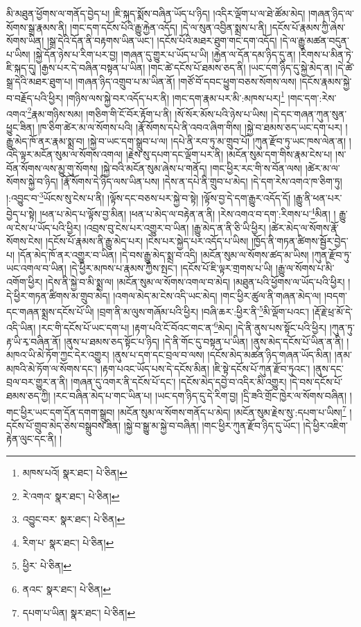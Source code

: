 མི་མཐུན་ཕྱོགས་ལ་གནོད་བྱེད་པ། །ཇི་སྐད་སྨོས་བཞིན་ཡོད་པ་ཉིད། །འདིར་ལྡོག་པ་ལ་ཐེ་ཚོམ་མེད། །གཞན་ཉིད་ལ་སོགས་སྒྲ་རྣམས་ནི། །གང་དག་དངོས་པོའི་རྒྱུ་རྐྱེན་འདོད། །དེ་ལ་སུན་འབྱིན་སྨྲས་པ་ནི། །དངོས་པོ་རྣམས་ཀྱི་ཞེས་སོགས་ཡིན། །སྒྲ་དེའི་དོན་ནི་བརྟགས་ཡིན་ཡང་། །དངོས་པོའི་མཐར་ཐུག་གང་དག་འདོད། །དེ་ལ་རྒྱུ་མཚན་བདུན་པ་ཡིས། །སྐྱེ་དོན་ཉེས་པ་རིག་པར་བྱ། །གཞན་དུ་གྱུར་པ་ཡོད་པ་ཡི། །རྐྱེན་ལ་དོན་དམ་ཉིད་དུ་ན། །རིགས་པ་མིན་ཏེ་ཇི་སྐད་དུ། །རྒྱས་པར་དེ་བཞིན་བསྟན་པ་ཡིན། །གང་ཚེ་དངོས་པོ་ཐམས་ཅད་ནི། །ཡང་དག་ཉིད་དུ་སྐྱེ་མེད་ན། །དེ་ཚེ་སྒྲ་དེའི་མཐར་ཐུག་པ། །གཞན་ཉིད་འགྲུབ་པ་མ་ཡིན་ནོ། །གཙོ་བོ་དབང་ཕྱུག་བཅས་སོགས་ལས། །དངོས་རྣམས་སྐྱེ་བ་བརྗོད་པའི་ཕྱིར། །གཉིས་ལས་སྐྱེ་བར་འདོད་པར་ནི། །གང་དག་རྣམ་པར་མི་:མཁས་པར།\footnote{མཁས་པའོ།  སྣར་ཐང་།  པེ་ཅིན། } །གང་དག་:རེས་འགའ་\footnote{རེ་འགའ་  སྣར་ཐང་།  པེ་ཅིན། }རྣམ་གཉིས་སམ། །གཅིག་གི་ངོ་བོར་རྟོག་པ་ནི། །སོ་སོར་མོས་པའི་ཉེས་པ་ཡིས། །དེ་དང་གཞན་ཀུན་སུན་ཕྱུང་ཟིན། །ཁ་ཅིག་ཚེར་མ་ལ་སོགས་པའི། །རྣོ་སོགས་དཔེ་ནི་འབའ་ཞིག་གིས། །སྐྱེ་བ་ཐམས་ཅད་ཡང་དག་པར། །རྒྱུ་མེད་ཁོ་ནར་རྣམ་སྨྲ་བ། །སྐྱེ་བ་ཡང་དག་སྒྲུབ་པ་ལ། །དཔེ་ནི་རབ་ཏུ་མ་གྲུབ་པོ། །ཀུན་རྫོབ་ཏུ་ཡང་ཁས་ལེན་ན། །འདི་ལྟར་མངོན་སུམ་ལ་སོགས་འགལ། །རྗེས་སུ་དཔག་དང་ལྡོག་པར་ནི། །མངོན་སུམ་དག་གིས་རྣམ་ངེས་པ། །ས་བོན་སོགས་ལས་མྱུ་གུ་སོགས། །སྐྱེ་བའི་མངོན་སུམ་ཞེས་པ་གནོད། །གང་ཕྱིར་རང་གི་ས་བོན་ལས། །ཚེར་མ་ལ་སོགས་སྐྱེ་བ་ཉིད། །རྣོ་སོགས་དེ་ཉིད་ལས་ཡིན་པས། །དེས་ན་དཔེ་ནི་གྲུབ་པ་མེད། །དེ་དག་རེས་འགའ་ཁ་ཅིག་ཏུ། །:འབྱུང་བ་\footnote{འབྱུང་བར་  སྣར་ཐང་།  པེ་ཅིན། }ཡོངས་སུ་ངེས་པ་ནི། །ལྟོས་དང་བཅས་པར་སྐྱེ་བ་སྟེ། །ལྟོས་བྱ་དེ་དག་རྒྱུར་འདོད་དོ། །རྒྱུ་ནི་ཕན་པར་བྱེད་པ་སྟེ། །ཕན་པ་མེད་པ་ལྟོས་བྱ་མིན། །ཕན་པ་མེད་ལ་བརྟེན་ན་ནི། །རེས་འགའ་བ་དག་:རིགས་པ་\footnote{རིག་པ་  སྣར་ཐང་།  པེ་ཅིན། }མིན། །
རྒྱུ་ལ་ངེས་པ་ཡོད་པའི་ཕྱིར། །འབྲས་བུ་ངེས་པར་འགྱུར་བ་ཡིན། །རྒྱུ་མེད་ན་ནི་ཅི་ཡི་ཕྱིར། །ཚེར་མེད་ལ་སོགས་རྣོ་སོགས་ངེས། །དངོས་པོ་རྣམས་ནི་རྒྱུ་མེད་པར། །ངེས་པར་སྐྱེད་པར་འདོད་པ་ཡིས། །ཁྱོད་ནི་གཏན་ཚིགས་སྦྱོར་བྱེད་པ། །དོན་མེད་ཁོ་ནར་འགྱུར་བ་ཡིན། །དེ་བས་རྒྱུ་མེད་སྨྲ་བ་འདི། །མངོན་སུམ་ལ་སོགས་ཚད་མ་ཡིས། །ཀུན་རྫོབ་ཏུ་ཡང་འགལ་བ་ཡིན། །དེ་ཕྱིར་མཁས་པ་རྣམས་ཀྱིས་སྤང་། །དངོས་པོ་ཇི་ལྟར་གྲགས་པ་ཡི། །རྒྱུ་ལ་སོགས་པ་མི་འགོག་ཕྱིར། །དེས་ནི་སྐྱེ་བ་མི་སྨྲ་ལ། །མངོན་སུམ་ལ་སོགས་འགལ་བ་མེད། །མཐུན་པའི་ཕྱོགས་ལ་ཡོད་པའི་ཕྱིར། །དེ་ཕྱིར་གཏན་ཚིགས་མ་གྲུབ་མེད། །འགལ་མེད་མ་ངེས་འདི་ཡང་མེད། །གང་ཕྱིར་ཚུལ་ནི་གཞན་མེད་ལ། །བདག་དང་གཞན་སྨྲས་དངོས་པོ་ཡི། །བྲག་ནི་མ་ལུས་གཞོམ་པའི་ཕྱིར། །བཞི་ཆར་:ཕྱིར་ནི་\footnote{ཕྱིར་  པེ་ཅིན། }མི་ལྡོག་པའང་། །རྡོ་རྗེ་ཕྲ་མོ་དེ་འདི་ཡིན། །རང་གི་དངོས་པོ་ཡང་དག་པ། །རྟག་པའི་ངོ་བོའང་གང་ན་\footnote{ནའང་  སྣར་ཐང་།  པེ་ཅིན། }མེད། །དེ་ནི་ནུས་པས་སྟོང་པའི་ཕྱིར། །ཀུན་ཏུ་རྟ་ཡི་རྭ་བཞིན་ནོ། །ནུས་པ་ཐམས་ཅད་སྟོང་པ་ཉིད། །དེ་ནི་གོང་དུ་བསྟན་པ་ཡིན། །ནུས་མེད་དངོས་པོ་ཡིན་ན་ནི། །མཁའ་ཡི་མེ་ཏོག་ཀྱང་དེར་འགྱུར། །ནུས་པ་དག་དང་བྲལ་བ་ལས། །དངོས་མེད་མཚན་ཉིད་གཞན་ཡོད་མིན། །ནམ་མཁའི་མེ་ཏོག་ལ་སོགས་དང་། །རྟག་པའང་ཡོད་པས་དེ་དངོས་མིན། །ཇི་སྟེ་དངོས་པོ་ཀུན་རྫོབ་ཏུའང་། །ནུས་དང་བྲལ་བར་གྱུར་ན་ནི། །གཞན་དུ་འགར་ནི་དངོས་པོ་དང་། །དངོས་མེད་དབྱེ་བ་འདིར་མི་འགྱུར། །དེ་བས་དངོས་པོ་ཐམས་ཅད་ཀྱི། །རང་བཞིན་མེད་པ་གང་ཡིན་པ། །ཡང་དག་ཉིད་དུ་དེ་རིག་བྱ། །དྲི་ཟའི་གྲོང་ཁྱེར་ལ་སོགས་བཞིན། །གང་ཕྱིར་ཡང་དག་དོན་དགག་སྒྲུབ། །མངོན་སུམ་ལ་སོགས་གནོད་པ་མེད། །མངོན་སུམ་རྗེས་སུ་:དཔག་པ་ཡིས།\footnote{དཔག་པ་ཡིན།  སྣར་ཐང་།  པེ་ཅིན། } །དངོས་པོ་གྲུབ་མེད་ཅེས་བསྒྲུབས་ཟིན། །སྐྱེ་བ་སྒྱུ་མ་སྐྱེ་བ་བཞིན། །གང་ཕྱིར་ཀུན་རྫོབ་ཉིད་དུ་ཡོང་། །དེ་ཕྱིར་འཇིག་རྟེན་ལུང་དང་ནི། །
